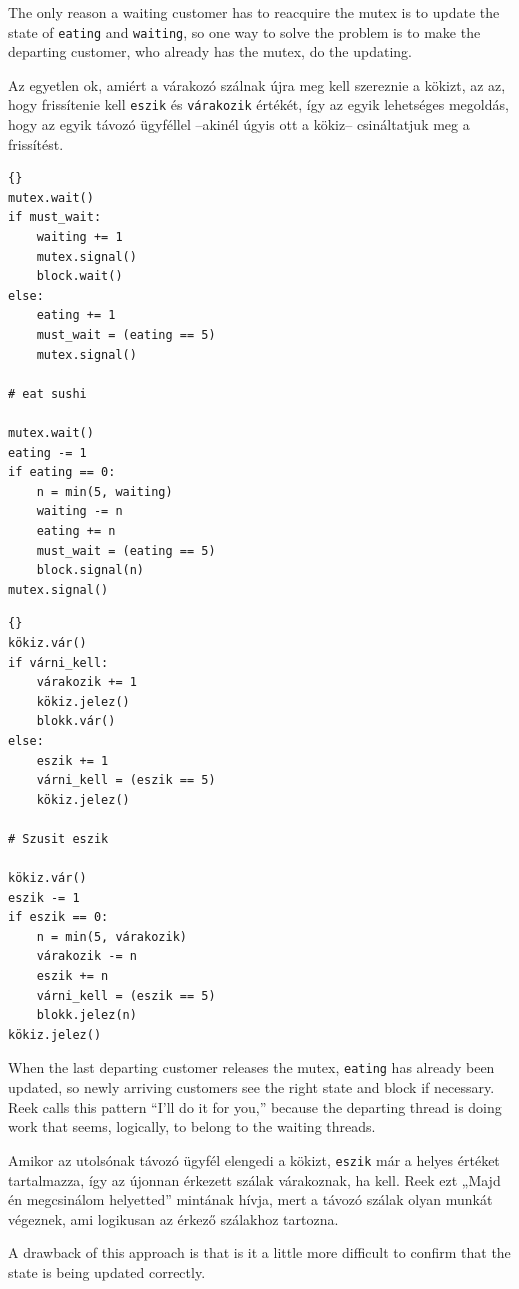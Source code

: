 \documentclass{book}
\begin{document}
The only reason a waiting customer has to reacquire the mutex
is to update the state of {\tt eating} and {\tt waiting}, so
one way to solve the problem is to make the departing customer,
who already has the mutex, do the updating.

Az egyetlen ok, amiért a várakozó szálnak újra meg kell szereznie
a kökizt, az az, hogy frissítenie kell {\tt eszik} és {\tt várakozik}
értékét, így az egyik lehetséges megoldás, hogy az egyik távozó
ügyféllel --akinél úgyis ott a kökiz-- csináltatjuk meg a frissítést.

\begin{lstlisting}[title={Sushi bar solution \#1}]{}
mutex.wait()
if must_wait:
    waiting += 1
    mutex.signal()
    block.wait()
else:
    eating += 1
    must_wait = (eating == 5)
    mutex.signal()

# eat sushi

mutex.wait()
eating -= 1
if eating == 0:
    n = min(5, waiting)
    waiting -= n
    eating += n
    must_wait = (eating == 5)
    block.signal(n)
mutex.signal()
\end{lstlisting}

\begin{lstlisting}[title={Szusi bár megoldás \#1}]{}
kökiz.vár()
if várni_kell:
    várakozik += 1
    kökiz.jelez()
    blokk.vár()
else:
    eszik += 1
    várni_kell = (eszik == 5)
    kökiz.jelez()

# Szusit eszik

kökiz.vár()
eszik -= 1
if eszik == 0:
    n = min(5, várakozik)
    várakozik -= n
    eszik += n
    várni_kell = (eszik == 5)
    blokk.jelez(n)
kökiz.jelez()
\end{lstlisting}

When the last departing customer releases the mutex, 
{\tt eating} has already been updated, so newly arriving customers
see the right state and block if necessary.  Reek calls this
pattern ``I'll do it for you,'' because the departing thread
is doing work that seems, logically, to belong to the waiting
threads.

Amikor az utolsónak távozó ügyfél elengedi a kökizt, {\tt eszik}
már a helyes értéket tartalmazza, így az újonnan érkezett szálak
várakoznak, ha kell. Reek ezt „Majd én megcsinálom helyetted”
mintának hívja, mert a távozó szálak olyan munkát végeznek,
ami logikusan az érkező szálakhoz tartozna.

A drawback of this approach is that is it a little more difficult
to confirm that the state is being updated correctly.
\end{document}
